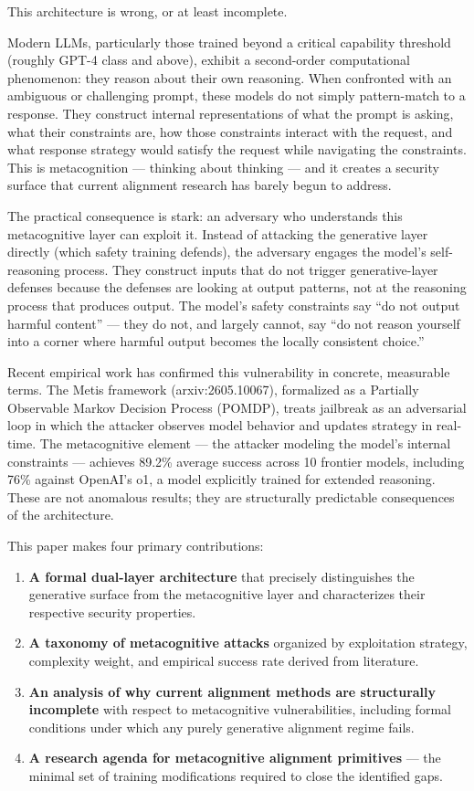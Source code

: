 \documentclass[
  11pt,
]{article}
\begin{document}
This architecture is wrong, or at least incomplete.

Modern LLMs, particularly those trained beyond a critical capability
threshold (roughly GPT-4 class and above), exhibit a second-order
computational phenomenon: they reason about their own reasoning. When
confronted with an ambiguous or challenging prompt, these models do not
simply pattern-match to a response. They construct internal
representations of what the prompt is asking, what their constraints
are, how those constraints interact with the request, and what response
strategy would satisfy the request while navigating the constraints.
This is metacognition --- thinking about thinking --- and it creates a
security surface that current alignment research has barely begun to
address.

The practical consequence is stark: an adversary who understands this
metacognitive layer can exploit it. Instead of attacking the generative
layer directly (which safety training defends), the adversary engages
the model's self-reasoning process. They construct inputs that do not
trigger generative-layer defenses because the defenses are looking at
output patterns, not at the reasoning process that produces output. The
model's safety constraints say ``do not output harmful content'' ---
they do not, and largely cannot, say ``do not reason yourself into a
corner where harmful output becomes the locally consistent choice.''

Recent empirical work has confirmed this vulnerability in concrete,
measurable terms. The Metis framework (arxiv:2605.10067), formalized as
a Partially Observable Markov Decision Process (POMDP), treats jailbreak
as an adversarial loop in which the attacker observes model behavior and
updates strategy in real-time. The metacognitive element --- the
attacker modeling the model's internal constraints --- achieves 89.2\%
average success across 10 frontier models, including 76\% against
OpenAI's o1, a model explicitly trained for extended reasoning. These
are not anomalous results; they are structurally predictable
consequences of the architecture.

This paper makes four primary contributions:

\begin{enumerate}
\def\labelenumi{\arabic{enumi}.}
\item
  \textbf{A formal dual-layer architecture} that precisely distinguishes
  the generative surface from the metacognitive layer and characterizes
  their respective security properties.
\item
  \textbf{A taxonomy of metacognitive attacks} organized by exploitation
  strategy, complexity weight, and empirical success rate derived from
  literature.
\item
  \textbf{An analysis of why current alignment methods are structurally
  incomplete} with respect to metacognitive vulnerabilities, including
  formal conditions under which any purely generative alignment regime
  fails.
\item
  \textbf{A research agenda for metacognitive alignment primitives} ---
  the minimal set of training modifications required to close the
  identified gaps.
\end{enumerate}
\end{document}
